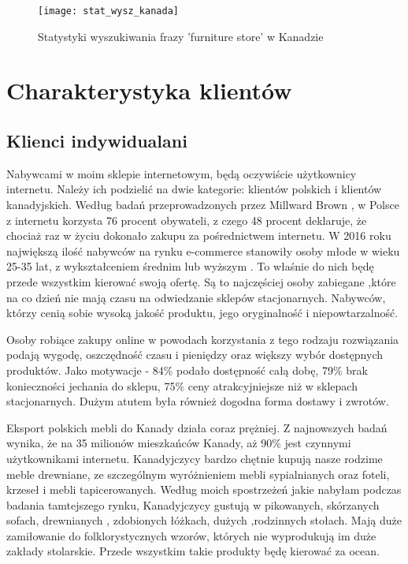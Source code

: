 		\begin{figure}[H]
			\centering
			\texttt{[image: stat\_wysz\_kanada]}
			\caption{Statystyki wyszukiwania frazy 'furniture store' w Kanadzie}
		\end{figure}
	
	
	\section{Charakterystyka klientów}
		\subsection{Klienci indywidualani}
			\par Nabywcami w moim sklepie internetowym, będą oczywiście użytkownicy internetu. Należy ich podzielić na dwie kategorie: klientów polskich i klientów kanadyjskich.
			Według badań przeprowadzonych przez Millward Brown , w Polsce z internetu korzysta 76 procent obywateli, z czego 48 procent deklaruje, że chociaż raz w życiu dokonało zakupu za pośrednictwem internetu. W 2016 roku największą ilość nabywców na rynku e-commerce stanowiły osoby młode w wieku 25-35 lat, z wykształceniem średnim lub wyższym . To właśnie do nich będę przede wszystkim kierować swoją ofertę. Są to najczęściej osoby zabiegane ,które na co dzień  nie mają czasu na odwiedzanie sklepów stacjonarnych. Nabywców, którzy cenią sobie wysoką jakość produktu, jego oryginalność i niepowtarzalność.
			
			\par Osoby robiące zakupy online w powodach korzystania z tego rodzaju rozwiązania podają wygodę, oszczędność czasu i pieniędzy oraz większy wybór dostępnych produktów. Jako motywacje - 84\% podało dostępność całą dobę, 79\% brak konieczności jechania do sklepu, 75\% ceny atrakcyjniejsze niż w sklepach stacjonarnych. Dużym atutem była również dogodna forma dostawy i zwrotów.
			
			\par Eksport polskich mebli do Kanady działa coraz prężniej. Z najnowszych badań wynika, że na 35 milionów mieszkańców Kanady, aż 90\% jest czynnymi użytkownikami internetu. Kanadyjczycy bardzo chętnie kupują nasze rodzime meble drewniane, ze szczególnym wyróżnieniem mebli sypialnianych  oraz foteli, krzeseł i mebli tapicerowanych. Według moich spostrzeżeń jakie nabyłam podczas badania tamtejszego rynku, Kanadyjczycy gustują w pikowanych, skórzanych sofach, drewnianych , zdobionych łóżkach, dużych ,rodzinnych stołach. Mają duże zamiłowanie do folklorystycznych wzorów, których nie wyprodukują im duże zakłady stolarskie. Przede wszystkim takie produkty będę kierować za ocean.
					

